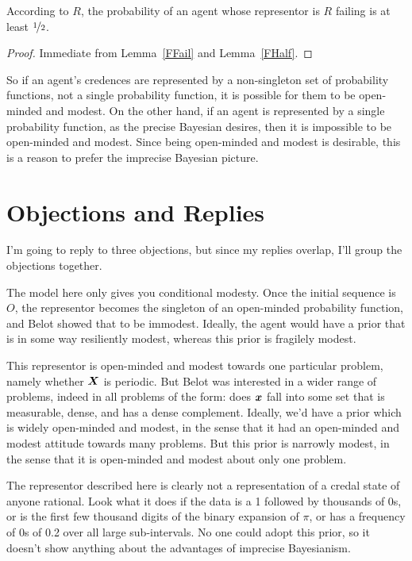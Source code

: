 \begin{theorem}
\label{Modesty}
According to $R$, the probability of an agent whose representor is $R$ failing is at least $\nicefrac{1}{2}$.
\end{theorem}
\begin{proof}
Immediate from Lemma~\ref{FFail} and Lemma~\ref{FHalf}.
\end{proof}
%
\noindent So if an agent's credences are represented by a non-singleton set of probability functions, not a single probability function, it is possible for them to be open-minded and modest. On the other hand, if an agent is represented by a single probability function, as the precise Bayesian desires, then it is impossible to be open-minded and modest. Since being open-minded and modest is desirable, this is a reason to prefer the imprecise Bayesian picture.

\section{Objections and Replies}
I'm going to reply to three objections, but since my replies overlap, I'll group the objections together.

\begin{objection}
The model here only gives you conditional modesty. Once the initial sequence is $O$, the representor becomes the singleton of an open-minded probability function, and Belot showed that to be immodest. Ideally, the agent would have a prior that is in some way resiliently modest, whereas this prior is fragilely modest.
\end{objection}

\begin{objection}
This representor is open-minded and modest towards one particular problem, namely whether $\boldsymbol{X}$ is periodic. But Belot was interested in a wider range of problems, indeed in all problems of the form: does $\boldsymbol{x}$ fall into some set that is measurable, dense, and has a dense complement. Ideally, we'd have a prior which is widely open-minded and modest, in the sense that it had an open-minded and modest attitude towards many problems. But this prior is narrowly modest, in the sense that it is open-minded and modest about only one problem.
\end{objection}

\begin{objection}
The representor described here is clearly not a representation of a credal state of anyone rational. Look what it does if the data is a 1 followed by thousands of 0s, or is the first few thousand digits of the binary expansion of $\pi$, or has a frequency of 0s of 0.2 over all large sub-intervals. No one could adopt this prior, so it doesn't show anything about the advantages of imprecise Bayesianism.
\end{objection}

